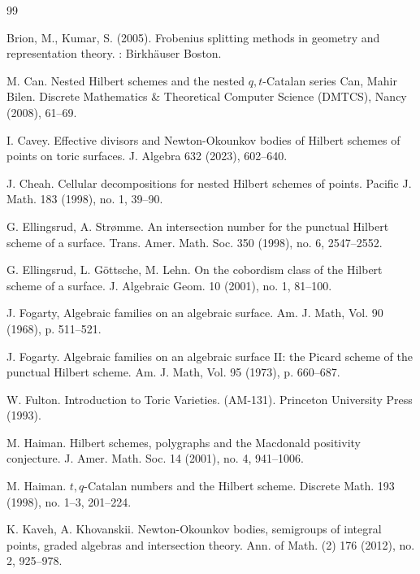 \documentclass[12pt]{amsart}
\numberwithin{equation}{section}
\theoremstyle{definition}
\begin{document}
 


 


%
%




\begin{thebibliography}{99}

 Brion, M.,  Kumar, S. (2005). Frobenius splitting methods in
  geometry and representation theory. : Birkhäuser Boston.

 M. Can. Nested Hilbert schemes and the nested  $q,t$-Catalan series
Can, Mahir Bilen.
Discrete Mathematics \& Theoretical Computer Science (DMTCS), Nancy (2008), 61--69.

 I. Cavey. Effective divisors and Newton-Okounkov bodies of Hilbert schemes of points on toric surfaces.
J. Algebra 632 (2023), 602--640.

 J. Cheah.
Cellular decompositions for nested Hilbert schemes of points. 
Pacific J. Math. 183 (1998), no. 1, 39--90.

 G. Ellingsrud, A. Str\o mme. An intersection number for the punctual Hilbert scheme of a surface.
Trans. Amer. Math. Soc. 350 (1998), no. 6, 2547--2552.

  G. Ellingsrud, L. G\"ottsche, M. Lehn. On the cobordism class of the Hilbert scheme of a surface.
J. Algebraic Geom. 10 (2001), no. 1, 81--100.

 J. Fogarty, Algebraic families on an algebraic surface. Am. J. Math, Vol. 90
(1968), p. 511--521.

 J. Fogarty. Algebraic families on an algebraic surface II: the Picard scheme
of the punctual Hilbert scheme. Am. J. Math, Vol. 95 (1973), p. 660--687.

 W. Fulton. Introduction to Toric Varieties. (AM-131). Princeton University Press (1993).

 M. Haiman. Hilbert schemes, polygraphs and the Macdonald positivity conjecture.
J. Amer. Math. Soc. 14 (2001), no. 4, 941--1006.


   M. Haiman. $t,q$-Catalan numbers and the Hilbert scheme.
Discrete Math. 193 (1998), no. 1--3, 201--224.

K. Kaveh, A. Khovanskii. Newton-Okounkov bodies, semigroups of integral points, graded
algebras and intersection theory. Ann. of Math. (2) 176 (2012), no. 2, 925--978.


\end{thebibliography}
\end{document}
